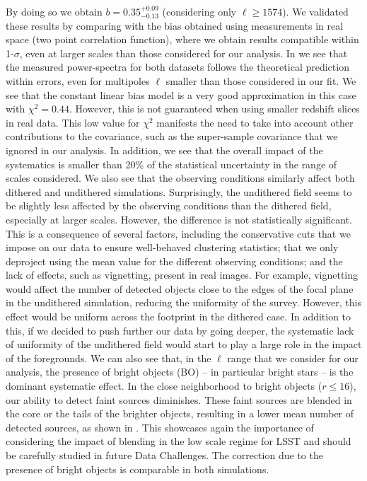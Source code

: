 \documentclass[twocolumn]{aastex62}
\begin{document}
By doing so we obtain $b = 0.35 ^{+ 0.09}_{- 0.13}$ (considering only $\ell \geq 1574$). We validated these results by comparing with the bias obtained using measurements in real space (two point correlation function), where we obtain results compatible within 1-$\sigma$, even at larger scales than those considered for our analysis. In  we see that the measured power-spectra for both datasets follows the theoretical prediction within errors, even for multipoles $\ell$ smaller than those considered in our fit. We see that the constant linear bias model is a very good approximation in this case with $\chi^{2}=0.44$. However, this is not guaranteed when using smaller redshift slices in real data. This low value for $\chi^{2}$ manifests the need to take into account other contributions to the covariance, such as the super-sample covariance that we ignored in our analysis. In addition, we see that the overall impact of the systematics is smaller than 20\% of the statistical uncertainty in the range of scales considered. We also see that the observing conditions similarly affect both dithered and undithered simulations. Surprisingly, the undithered field seems to be slightly less affected by the observing conditions than the dithered field, especially at larger scales. However, the difference is not statistically significant. This is a consequence of several factors, including the conservative cuts that we impose on our data to ensure well-behaved clustering statistics; that we only deproject using the mean value for the different observing conditions; and the lack of effects, such as vignetting, present in real images. For example, vignetting would affect the number of detected objects close to the edges of the focal plane in the undithered simulation, reducing the uniformity of the survey. However, this effect would be uniform across the footprint in the dithered case. In addition to this, if we decided to push further our data by going deeper, the systematic lack of uniformity of the undithered field would start to play a large role in the impact of the foregrounds. We can also see that, in the $\ell$ range that we consider for our analysis, the presence of bright objects (BO) -- in particular bright stars -- is the dominant systematic effect. In the close neighborhood to bright objects ($r \leq 16$), our ability to detect faint sources diminishes. These faint sources are blended in the core or the tails of the brighter objects, resulting in a lower mean number of detected sources, as shown in . This showcases again the importance of considering the impact of blending in the low scale regime for LSST and should be carefully studied in future Data Challenges. The correction due to the presence of bright objects is comparable in both simulations.
\end{document}
